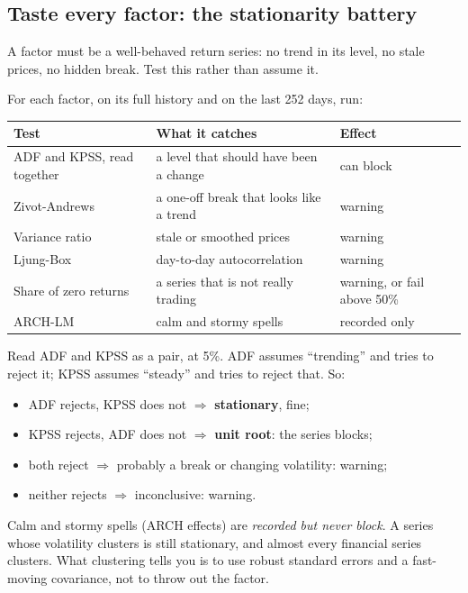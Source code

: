 \documentclass[11pt,a4paper]{article}
\begin{document}
\subsection{Taste every factor: the stationarity battery}

A factor must be a well-behaved return series: no trend in its level, no stale
prices, no hidden break. Test this rather than assume it.

\begin{method}
For each factor, on its full history and on the last 252 days, run:
\begin{center}
\small
\begin{tabularx}{\linewidth}{@{}lXl@{}}
\toprule
Test & What it catches & Effect \\
\midrule
ADF and KPSS, read together & a level that should have been a change & can block \\
Zivot-Andrews & a one-off break that looks like a trend & warning \\
Variance ratio & stale or smoothed prices & warning \\
Ljung-Box & day-to-day autocorrelation & warning \\
Share of zero returns & a series that is not really trading & warning, or fail above 50\% \\
ARCH-LM & calm and stormy spells & recorded only \\
\bottomrule
\end{tabularx}
\end{center}
Read ADF and KPSS as a pair, at 5\%. ADF assumes ``trending'' and tries to reject it;
KPSS assumes ``steady'' and tries to reject that. So:
\begin{itemize}[leftmargin=1.2em]
  \item ADF rejects, KPSS does not $\Rightarrow$ \textbf{stationary}, fine;
  \item KPSS rejects, ADF does not $\Rightarrow$ \textbf{unit root}: the series blocks;
  \item both reject $\Rightarrow$ probably a break or changing volatility: warning;
  \item neither rejects $\Rightarrow$ inconclusive: warning.
\end{itemize}
\end{method}

\begin{tip}
Calm and stormy spells (ARCH effects) are \emph{recorded but never block}. A series
whose volatility clusters is still stationary, and almost every financial series
clusters. What clustering tells you is to use robust standard errors and a
fast-moving covariance, not to throw out the factor.
\end{tip}
\end{document}
